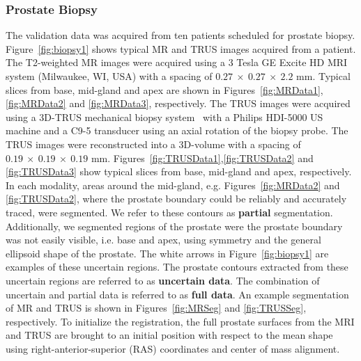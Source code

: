 \documentclass[journal]{IEEEtran}
\begin{document}
\subsubsection{Prostate Biopsy}\label{sec:biopsy}
The validation data was acquired from ten patients scheduled for prostate biopsy. Figure~\ref{fig:biopsy1} shows typical MR and TRUS images acquired from a patient. The T2-weighted MR images were acquired using a 3 Tesla GE Excite HD MRI system (Milwaukee, WI, USA) with a spacing of $0.27~\times~0.27~\times~2.2$ mm. Typical slices from base, mid-gland and apex are shown in Figures~\ref{fig:MRData1},\ref{fig:MRData2} and \ref{fig:MRData3}, respectively. The TRUS images were acquired using a 3D-TRUS mechanical biopsy system~\cite{Bax08a} with a Philips HDI-5000 US machine and a C9-5 transducer using an axial rotation of the biopsy probe. The TRUS images were reconstructed into a 3D-volume with a spacing of $0.19~\times~0.19~\times~0.19$ mm. Figures~\ref{fig:TRUSData1},\ref{fig:TRUSData2} and \ref{fig:TRUSData3} show typical slices from base, mid-gland and apex, respectively. In each modality, areas around the mid-gland, e.g. Figures~\ref{fig:MRData2} and \ref{fig:TRUSData2}, where the prostate boundary could be reliably and accurately traced, were segmented. We refer to these contours as \textbf{partial} segmentation. Additionally, we segmented regions of the prostate were the prostate boundary was not easily visible, i.e. base and apex, using symmetry and the general ellipsoid shape of the prostate. The white arrows in Figure~\ref{fig:biopsy1} are examples of these uncertain regions. The prostate contours extracted from these uncertain regions are referred to as \textbf{uncertain data}. The combination of uncertain and partial data is referred to as \textbf{full data}. An example segmentation of MR and TRUS is shown in Figures~\ref{fig:MRSeg} and \ref{fig:TRUSSeg}, respectively. To initialize the registration, the full prostate surfaces from the MRI and TRUS are brought to an initial position with respect to the mean shape using right-anterior-superior (RAS) coordinates and center of mass alignment.
\end{document}
